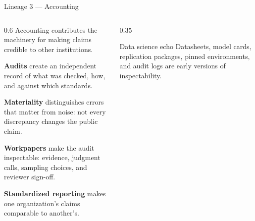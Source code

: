 \documentclass[9pt,aspectratio=169]{beamer}
\begin{document}
\begin{frame}{Lineage 3 --- Accounting}
    \begin{columns}[T]
        \begin{column}{0.6\textwidth}
            Accounting contributes the machinery for making claims credible to other institutions.

            \medskip

            \textbf{Audits} create an independent record of what was checked, how, and against which standards.

            \medskip

            \textbf{Materiality} distinguishes errors that matter from noise: not every discrepancy changes the public claim.

            \medskip

            \textbf{Workpapers} make the audit inspectable: evidence, judgment calls, sampling choices, and reviewer sign-off.

            \medskip

            \textbf{Standardized reporting} makes one organization's claims comparable to another's.
        \end{column}
        \begin{column}{0.35\textwidth}
            \begin{alertblock}{Data science echo}
                \small
                Datasheets, model cards, replication packages, pinned environments, and audit logs
                are early versions of inspectability.
            \end{alertblock}
        \end{column}
    \end{columns}
\end{frame}
\end{document}
